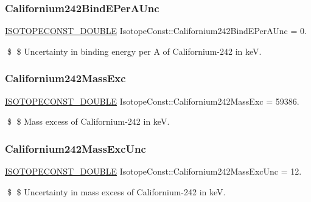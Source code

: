 \subsubsection{\texorpdfstring{Californium242\+Bind\+E\+Per\+A\+Unc}{Californium242BindEPerAUnc}}
{\footnotesize\ttfamily \mbox{\hyperlink{group___isotope_const-_macros_ga8f45a7272ce02c0b4c65c44636ed719a}{I\+S\+O\+T\+O\+P\+E\+C\+O\+N\+S\+T\+\_\+\+D\+O\+U\+B\+LE}} Isotope\+Const\+::\+Californium242\+Bind\+E\+Per\+A\+Unc = 0.}

\$ \$ Uncertainty in binding energy per A of Californium-\/242 in keV. \mbox{\label{group___isotope_const-_californium-_cf242_ga795f1b85a42a2842cb341daa5fb31369}} 
\subsubsection{\texorpdfstring{Californium242\+Mass\+Exc}{Californium242MassExc}}
{\footnotesize\ttfamily \mbox{\hyperlink{group___isotope_const-_macros_ga8f45a7272ce02c0b4c65c44636ed719a}{I\+S\+O\+T\+O\+P\+E\+C\+O\+N\+S\+T\+\_\+\+D\+O\+U\+B\+LE}} Isotope\+Const\+::\+Californium242\+Mass\+Exc = 59386.}

\$ \$ Mass excess of Californium-\/242 in keV. \mbox{\label{group___isotope_const-_californium-_cf242_gae7bc0c9e281290e30e6c0e68fe41a91e}} 
\subsubsection{\texorpdfstring{Californium242\+Mass\+Exc\+Unc}{Californium242MassExcUnc}}
{\footnotesize\ttfamily \mbox{\hyperlink{group___isotope_const-_macros_ga8f45a7272ce02c0b4c65c44636ed719a}{I\+S\+O\+T\+O\+P\+E\+C\+O\+N\+S\+T\+\_\+\+D\+O\+U\+B\+LE}} Isotope\+Const\+::\+Californium242\+Mass\+Exc\+Unc = 12.}

\$ \$ Uncertainty in mass excess of Californium-\/242 in keV. \mbox{\label{group___isotope_const-_californium-_cf242_gac59e237875b40d064180a67ab5ea92cc}} 
